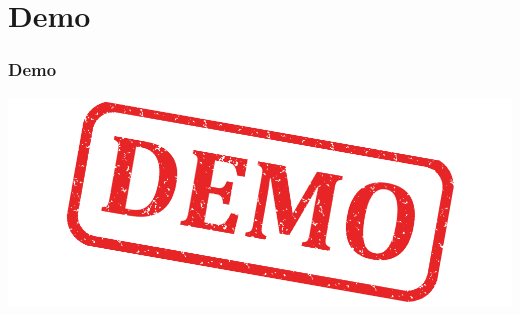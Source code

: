 \section{Demo}

\begin{frame}
  \frametitle{Demo}
  \includegraphics[width=\textwidth]{images/demo}
\end{frame}



